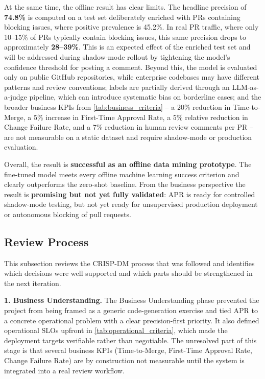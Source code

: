 \documentclass[11pt]{article}
\begin{document}
At the same time, the offline result has clear limits. The headline precision of \textbf{74.8\%} is computed on a test set deliberately enriched with PRs containing blocking issues, where positive prevalence is 45.2\%. In real PR traffic, where only 10--15\% of PRs typically contain blocking issues, this same precision drops to approximately \textbf{28--39\%}. This is an expected effect of the enriched test set and will be addressed during shadow-mode rollout by tightening the model's confidence threshold for posting a comment. Beyond this, the model is evaluated only on public GitHub repositories, while enterprise codebases may have different patterns and review conventions; labels are partially derived through an LLM-as-a-judge pipeline, which can introduce systematic bias on borderline cases; and the broader business KPIs from \cref{tab:business_criteria} -- a 20\% reduction in Time-to-Merge, a 5\% increase in First-Time Approval Rate, a 5\% relative reduction in Change Failure Rate, and a 7\% reduction in human review comments per PR -- are not measurable on a static dataset and require shadow-mode or production evaluation.

Overall, the result is \textbf{successful as an offline data mining prototype}. The fine-tuned model meets every offline machine learning success criterion and clearly outperforms the zero-shot baseline. From the business perspective the result is \textbf{promising but not yet fully validated}: APR is ready for controlled shadow-mode testing, but not yet ready for unsupervised production deployment or autonomous blocking of pull requests.

\subsection*{Review Process}

This subsection reviews the CRISP-DM process that was followed and identifies which decisions were well supported and which parts should be strengthened in the next iteration.

\textbf{1. Business Understanding.}
The Business Understanding phase prevented the project from being framed as a generic code-generation exercise and tied APR to a concrete operational problem with a clear precision-first priority. It also defined operational SLOs upfront in \cref{tab:operational_criteria}, which made the deployment targets verifiable rather than negotiable. The unresolved part of this stage is that several business KPIs (Time-to-Merge, First-Time Approval Rate, Change Failure Rate) are by construction not measurable until the system is integrated into a real review workflow.
\end{document}
